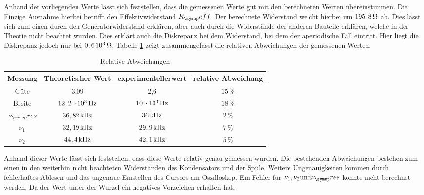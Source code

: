 Anhand der vorliegenden Werte lässt sich feststellen, dass die gemessenen
Werte gut mit den berechneten Werten übereinstimmen. Die Einzige Ausnahme hierbei
betrifft den Effektivwiderstand $R_\su{eff}$. Der berechnete Widerstand weicht
hierbei um $195,8\,\si{\ohm}$ ab. Dies lässt sich zum einen durch den Generatorwiderstand
erklären, aber auch durch die Widerstände der anderen Bauteile erklären, welche
in der Theorie nicht beachtet wurden. Dies erklärt auch die Diskrepanz bei dem
Widerstand, bei dem der aperiodische Fall eintritt. Hier liegt die Diskrepanz
jedoch nur bei $0,6\,10^3\,\si{\ohm}$.
Tabelle \ref{tab:fehler} zeigt zusammengefasst die relativen Abweichungen der
gemessenen Werten.
\begin{table}
  \centering
  \begin{tabular}{c c c c}
    \toprule
    Messung  & Theoretischer Wert & experimentellerwert & relative Abweichung \\
     \midrule
     Güte & 3,09 & 2,6 & $15\,\si{\percent}$ \\
     Breite & $12,2\,\cdot 10^3\,\si{\hertz}$ & $10\,\cdot 10^3\,\si{\hertz}$ & $18\,\si{\percent}$ \\
     $\nu_\su{res}$ & $36,82\,\si{\kilo\hertz}$ & $36\,\si{\kilo\hertz}$ & $2\,\si{\percent}$ \\
     $\nu_1$ & $32,19\,\si{\kilo\hertz}$ & $29,9\,\si{\kilo\hertz}$ & $7\,\si{\percent}$ \\
     $\nu_2$ & $44,4\,\si{\kilo\hertz}$ & $42,1\,\si{\kilo\hertz}$ & $5\,\si{\percent}$ \\
     \bottomrule
  \end{tabular}
  \caption{Relative Abweichungen}
  \label{tab:fehler}
\end{table}
Anhand dieser Werte lässt sich feststellen, dass diese Werte relativ genau gemessen
wurden. Die bestehenden Abweichungen bestehen zum einen in den weiterhin nicht
beachteten Widerständen des Kondensators und der Spule. Weitere Ungenauigkeiten
kommen durch fehlerhaftes Ablesen und das ungenaue Einstellen des Cursors
am Oszilloskop.
Ein Fehler für $\nu_1, \nu_2 \text{und} \nu_\su{res}$ konnte nicht berechnet werden,
Da der Wert unter der Wurzel ein negatives Vorzeichen erhalten hat.

